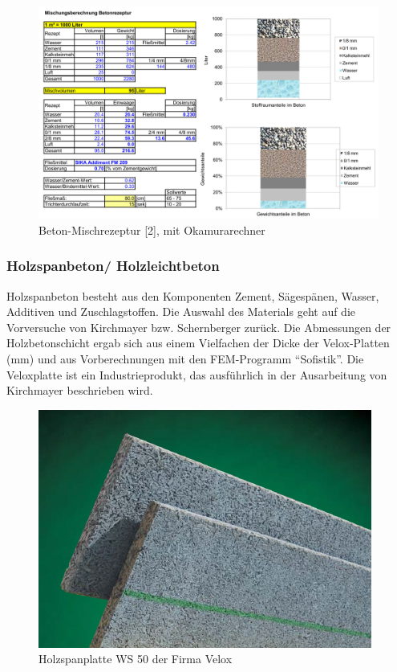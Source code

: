 \begin{figure}[h]
\begin{center}
\includegraphics[scale =1.1]{Aufbau/bauteile/Beton-Mischrezeptur.png}
\caption{Beton-Mischrezeptur [2], mit Okamurarechner}
\label{Beton-Mischrezeptur}
\end{center}
\end{figure}


\subsubsection{Holzspanbeton/ Holzleichtbeton}

Holzspanbeton besteht aus den Komponenten Zement, Sägespänen, Wasser, Additiven und Zuschlagstoffen. Die Auswahl des Materials geht auf die Vorversuche von Kirchmayer bzw. Schernberger zurück. 
Die Abmessungen der Holzbetonschicht ergab sich aus einem Vielfachen der Dicke der Velox-Platten (\unit[50]{mm}) und aus Vorberechnungen mit den FEM-Programm        "`Sofistik"'. Die Veloxplatte ist ein Industrieprodukt, das ausführlich in der Ausarbeitung von Kirchmayer beschrieben wird.


\begin{figure}[h]
\begin{center}
\includegraphics[scale =0.7]{Aufbau/bauteile/velox.png}
\caption{Holzspanplatte WS 50 der Firma Velox}
\label{velox}
\end{center}
\end{figure}

